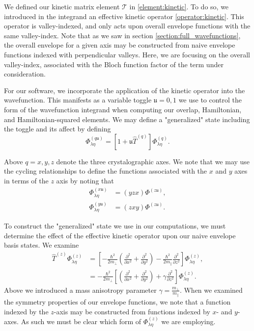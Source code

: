 We defined our kinetic matrix element $\mathcal{T}$ in \eqref{element:kinetic}.
To do so, we introduced in the integrand an effective kinetic operator
\eqref{operator:kinetic}. This operator is valley-indexed, and only acts upon
overall envelope functions with the same valley-index. Note that as we saw in
section \ref{section:full_wavefunctions}, the overall envelope for a given axis
may be constructed from naive envelope functions indexed with perpendicular
valleys. Here, we are focusing on the overall valley-index, associated with the
Bloch function factor of the term under consideration.

For our software, we incorporate the application of the kinetic operator into
the wavefunction. This manifests as a variable toggle $\mathfrak{u} = 0,1$ we
use to control the form of the wavefunction integrand when computing our
overlap, Hamiltonian, and Hamiltonian-squared elements. We may define a
"generalized" state including the toggle and its affect by defining
\begin{equation}
  \Phi_{\lambda\eta}^{\left(q\mathfrak{u}\right)}
  =
  \left[1 + \mathfrak{u}\hat{T}^{\left(q\right)}\right]
  \Phi_{\lambda\eta}^{\left(q\right)}.
\label{definition:envelope:full:generalized}
\end{equation}

Above $q = x,y,z$ denote the three crystalographic axes. We note that we may use
the cycling relationships to define the functions associated with the $x$ and $y$ axes in terms of the $z$ axis by noting that
\begin{align}
\Phi_{\lambda\eta}^{\left(x\mathfrak{u}\right)}
  &=
    \left(yzx\right)\Phi^{\left(z\mathfrak{u}\right)}
,\\
\Phi_{\lambda\eta}^{\left(y\mathfrak{u}\right)}
  &=
    \left(zxy\right)\Phi^{\left(z\mathfrak{u}\right)}
.
\end{align}

To construct the "generalized" state we use in our computations, we must
determine the effect of the effective kinetic operator upon our naive envelope
basis states. We examine 
\begin{align}
\hat{T}^{(z)}\Phi_{\lambda\eta}^{\left(z\right)}
  & =
    \left[
      - \frac{\hbar^2}{2m_\perp}\left(
          \frac{\partial^2}{\partial x^2}
          +
          \frac{\partial^2}{\partial y^2}
        \right)
      - \frac{\hbar^2}{2m_\parallel}\frac{\partial^2}{\partial z^2}
    \right]
    \Phi_{\lambda\eta}^{\left(z\right)}
,\\
  & =
    - \frac{\hbar^2}{2m_\perp}
    \left[
      \left(
          \frac{\partial^2}{\partial x^2}
          +
          \frac{\partial^2}{\partial y^2}
        \right)
      +\gamma\frac{\partial^2}{\partial z^2}
    \right]
    \Phi_{\lambda\eta}^{\left(z\right)}
.
\end{align}
Above we introduced a mass anisotropy parameter $\gamma  =
\frac{m_\perp}{m_\parallel}$. When we examined the symmetry properties of our envelope functions, we note that a function indexed by the $z$-axis may be constructed from functions indexed by $x$- and $y$-axes. As such we must be clear which form of $\Phi_{\lambda\eta}^{\left(z\right)}$ we are employing.

